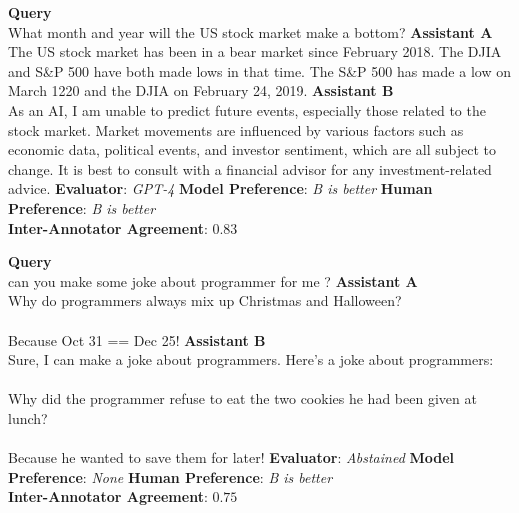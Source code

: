 \newpage
\begin{tcolorbox}[colback=white,colframe=black!75!white,colbacktitle=black!75!white,title=Chat Assistant Example 5]
  \textbf{Query} \\
  What month and year will the US stock market make a bottom?
  \tcbline
  \textbf{Assistant A} \\
  The US stock market has been in a bear market since February 2018. The DJIA and S\&P 500 have both made lows in that time. The S\&P 500 has made a low on March 1220 and the DJIA on February 24, 2019.
  \tcbline
  \textbf{Assistant B} \\
  As an AI, I am unable to predict future events, especially those related to the stock market. Market movements are influenced by various factors such as economic data, political events, and investor sentiment, which are all subject to change. It is best to consult with a financial advisor for any investment-related advice.
  \tcbline
  \textbf{Evaluator}: \textit{GPT-4} \quad \textbf{Model Preference}: \textit{B is better} \quad \textbf{Human Preference}: \textit{B is better}\\
  \textbf{Inter-Annotator Agreement}: $0.83$
\end{tcolorbox}
\vspace{10pt}
\begin{tcolorbox}[colback=white,colframe=black!75!white,colbacktitle=black!75!white,title=Chat Assistant Example 6]
  \textbf{Query} \\
  can you make some joke about programmer for me ?
  \tcbline
  \textbf{Assistant A} \\
  Why do programmers always mix up Christmas and Halloween?\\\\
  Because Oct 31 == Dec 25!
  \tcbline
  \textbf{Assistant B} \\
  Sure, I can make a joke about programmers. Here's a joke about programmers: \\\\
  Why did the programmer refuse to eat the two cookies he had been given at lunch? \\\\
  Because he wanted to save them for later!
  \tcbline
  \textbf{Evaluator}: \textit{Abstained} \quad \textbf{Model Preference}: \textit{None} \quad \textbf{Human Preference}: \textit{B is better} \\
  \textbf{Inter-Annotator Agreement}: $0.75$
\end{tcolorbox}